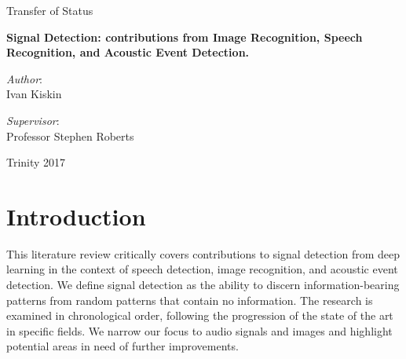 \documentclass[12pt]{llncs}
\begin{document}
\begin{titlepage}
\begin{center}
		\Large
		Transfer of Status
		
		\vspace{20mm}
		
		\huge
		\textbf{Signal Detection: contributions from Image Recognition, Speech Recognition, and Acoustic Event Detection.}
	\end{center}
	
	\vspace{23mm}
	
	\begin{minipage}[t]{0.5\textwidth}
		\raggedright
		\onehalfspacing
		\large
		\textit{Author}:\\[.5\baselineskip]
		Ivan Kiskin
	\end{minipage}%
	\begin{minipage}[t]{0.5\textwidth}
		\raggedleft
		\onehalfspacing
		\large
		\textit{Supervisor}:\\[.5\baselineskip]
		Professor Stephen Roberts
		
		\vspace{5mm}
	
	\end{minipage}%
	
	\vspace{\fill}
	
	\begin{minipage}[b]{\textwidth}
		\centering
		\onehalfspacing
		\large   
		Trinity 2017\\
		
		\vspace{20mm} 
	\end{minipage}%
	
\end{titlepage}


%


%
\pagestyle{headings}  %


\section{Introduction}
This literature review critically covers contributions to signal detection from deep learning in the context of speech detection, image recognition, and acoustic event detection. We define signal detection as the ability to discern information-bearing patterns from random patterns that contain no information. The research is examined in chronological order, following the progression of the state of the art in specific fields. We narrow our focus to audio signals and images and highlight potential areas in need of further improvements. 
\end{document}
